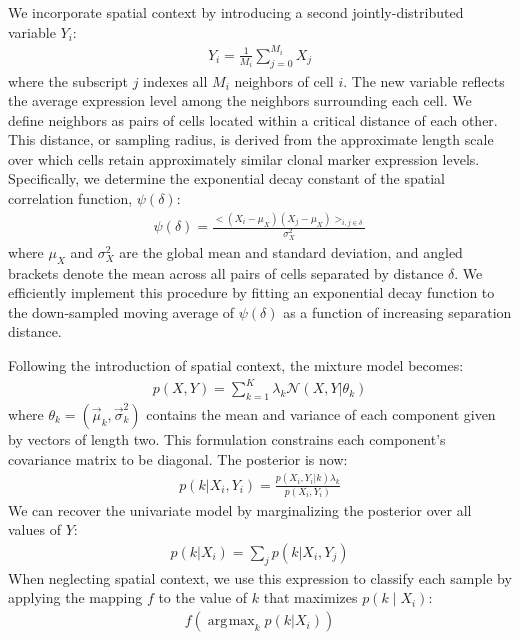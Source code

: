 \documentclass[10pt,letterpaper]{article}
\DeclareMathOperator*{\argmax}{\arg\!\max} %
\begin{document}
We incorporate spatial context by introducing a second jointly-distributed variable $Y_i$:
\begin{eqnarray}
Y_i = \frac{1}{M_i} \sum^{M_i}_{j=0} X_j
\end{eqnarray}
where the subscript $j$ indexes all $M_i$ neighbors of cell $i$. The new variable reflects the average expression level among the neighbors surrounding each cell. We define neighbors as pairs of cells located within a critical distance of each other. This distance, or sampling radius, is derived from the approximate length scale over which cells retain approximately similar clonal marker expression levels. Specifically, we determine the exponential decay constant of the spatial correlation function, $\psi (\delta)$:
\begin{eqnarray}
\psi(\delta) = \frac {<( X_i -\mu_{X})( X_j -\mu_{X})>_{i,j \in \delta}} {\sigma_X^2}
\end{eqnarray}
where $\mu_X$ and $\sigma_X^2$ are the global mean and standard deviation, and angled brackets denote the mean across all pairs of cells separated by distance $\delta$. We efficiently implement this procedure by fitting an exponential decay function to the down-sampled moving average of $\psi (\delta)$ as a function of increasing separation distance.

Following the introduction of spatial context, the mixture model becomes:
\begin{eqnarray}
\label{eq:bivariate_mixture}
p(X, Y) = \sum^{K}_{k=1}\lambda_k \mathcal{N}( X,Y |\theta_{k})
\end{eqnarray}
where $\theta_{k} = (\vec{\mu}_{k},\vec{\sigma}_{k}^2)$ contains the mean and variance of each component given by vectors of length two. This formulation constrains each component's covariance matrix to be diagonal. The posterior is now:
\begin{eqnarray}
p(k| X_i,Y_i) = \frac{p(X_i, Y_i | k) \lambda_k}{p(X_i, Y_i)}
\end{eqnarray}
We can recover the univariate model by marginalizing the posterior over all values of $Y$:
\begin{eqnarray}
p(k| X_i) = \sum_{j} p(k| X_i,Y_j)
\end{eqnarray}
When neglecting spatial context, we use this expression to classify each sample by applying the mapping $f$ to the value of $k$ that maximizes $p(k \mid X_i)$:
\begin{eqnarray}
f(\argmax_{k} p(k | X_i))
\end{eqnarray}
\end{document}

